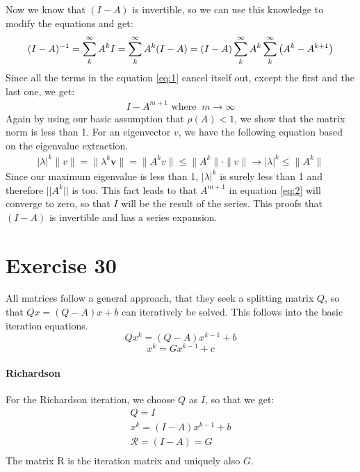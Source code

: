 Now we know that $(I-A)$ is invertible, so we can use this knowledge to modify the equations and get:
\begin{equation}
\label{eq:1}
(I-A)^{-1} = \sum\limits_k^{\infty} A^k \\
I =\sum\limits_k^{\infty} A^k (I-A) = (I-A) \sum\limits_k^{\infty} A^k \\
\sum\limits_k^{\infty} \left( A^k- A^{k+1} \right)
\end{equation}
Since all the terms in the equation \ref{eq:1} cancel itself out, except the first and the last one, we get:
\begin{gather*}
I - A^{m+1} \text{ where }\ m \rightarrow \infty
\end{gather*}
Again by using our basic assumption that $\rho(A) < 1$, we show that the matrix norm is less than 1. For an eigenvector $v$, we have the following equation based on the eigenvalue extraction.
\begin{align}
\label{eq:2}
|\lambda|^k\|v\| = \|\lambda^k \mathbf{v}\| = \|A^k v\| \leq \|A^k\|\cdot\|v\|
\rightarrow
|\lambda|^k\leq \|A^k\|
\end{align}
Since our maximum eigenvalue is less than 1, $|\lambda|^k$ is surely less than 1 and therefore $||A^k||$ is too.
This fact leads to that $A^{m+1}$ in equation \ref{eq:2} will converge to zero, so that $I$ will be the result of the series.
This proofs that $(I-A)$ is invertible and has a series expansion.

\section{Exercise 30}
All matrices follow a general approach, that they seek a splitting matrix $Q$, so that $Qx = (Q-A)x + b$ can iteratively be solved.
This follows into the basic iteration equations.
\begin{equation}
\label{eq:3}
Qx^k = (Q-A)x^{k-1} + b
\end{equation}
\begin{equation}
\label{eq:4}
x^k = G x^{k-1} + c
\end{equation}

\paragraph{Richardson}
For the Richardson iteration, we choose $Q$ as $I$, so that we get:
\begin{gather*}
Q = I \\
x^k = (I-A)x^{k-1} + b \\
\mathcal{R} = (I - A) = G \\
\end{gather*}
The matrix R is the iteration matrix and uniquely also $G$.

